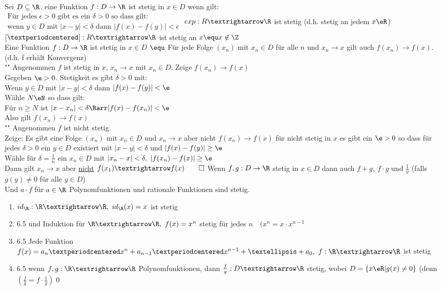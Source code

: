 \wdh
Sei $D \subseteq \R$. eine Funktion $f: D \to \R$ ist stetig in $x \in D$ wenn gilt:\\
$\begin{array}{ll}
\text{Für jedes $\epsilon > 0$ gibt es ein $\delta > 0$ so dass gilt:}\\
\text{wenn $y \in D$ mit $|x - y| < \delta$ dann $|f(x) - f(y)| < \epsilon$}
\end{array}$
\bsp
$exp:R→\R$ ist stetig (d.h. stetig an jedem $x\eR$)\\
$[·]:R→\R$ ist stetig an $x \equ x\not\in\Z$\\
Eine Funktion $f: D \to \R$ ist stetig in $x \in D$ $\equ$ Für jede Folge $(x_n)$ mit $x_n \in D$ für alle $n$ und $x_n \to x$ gilt auch $f(x_n) \to f(x)$.\\
(d.h. f erhält Konvergenz)\\
\bew
"\Rarr" Angenommen $f$ ist stetig in $x$, $x_n→x$ mit $x_n\in D$. Zeige $f(x_n)→f(x)$\\
Gegeben $\e>0$. Stetigkeit \Rarr{} es gibt $\delta>0$ mit:\\
Wenn $y\in D$ mit $|x-y|<\delta$ dann $|f(x)-f(y)|<\e$\\
Wähle $N\eN$ so dass gilt:\\
Für $n\geq N$ ist $|x-x_n|<\delta \Rarr |f(x)-f(x_n)|<\e$\\
Also gilt $f(x_n)→f(x)$\\
"\Larr" Angenommen $f$ ist nicht stetig.\\
Zeige: Es gibt eine Folge $(x_n)$ mit $x_n\in D$ und $x_n→x$ aber nicht $f(x_n)→f(x)$ für nicht stetig in $x$ \Rarr{} es gibt ein $\e>0$ so dass für jedes $\delta>0$ ein $y\in D$ existiert mit $|x-y|<\delta$ und $|f(x)-f(y)|\geq \e$\\
Wähle für $\delta=\frac{1}{n}$ ein $x_n\in D$ mit $|x_n-x|<\delta,\ |f(x_n)-f(x)|\geq\e$\\
Dann gilt $x_n→x$ aber \underline{nicht} $f(x_1)→f(x)\qed$
%
\wdh
{}
Wenn $f, g: D \to \R$ stetig in $x \in D$ dann auch $f + g,\ f \cdot g$ und $\frac{1}{g}$ (falls $g(y) \neq 0$ für alle $y \in D$) \\
Und $a \cdot f$ für $a \in \R$
Polynomfunktionen und rationale Funktionen sind stetig.
\bew
\begin{enumerate}
\item{$id_{\R}:\R→\R,\ id_{\R}(x)=x$ ist stetig}
\item{6.5 und Induktion \Rarr{} für $\R→\R,\ f(x)=x^n$ stetig für jedes $n\quad (x^n=x·x^{n-1}$}
\item{6.5 \Rarr{} Jede Funktion $f(x)=a_n·x^{n}+a_{n-1}·x^{n-1}+…+a_0,\ f:\R→\R$ ist stetig}
\item{6.5 \Rarr{} wenn $f,g:\R→\R$ Polynomfunktionen, dann $\frac{f}{g}:D→\R$ stetig, wobei $D=\{x\eR|g(x)\neq 0\}$ (denn $(\frac{f}{g}=f·\frac{1}{g})$\qed}
\end{enumerate}
